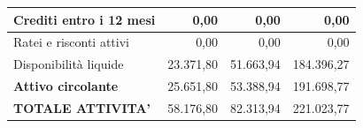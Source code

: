 \documentclass[12pt, a4paper]{article}
\begin{document}
\begin{center}
\begin{tabular}{|l|r|r|r|}
        Crediti entro i 12 mesi                                       & 0,00                                                          & 0,00                                                          & 0,00                                                          \\ \hline
        Ratei e risconti attivi                                       & 0,00                                                          & 0,00                                                          & 0,00                                                          \\ \hline
        Disponibilità liquide                                         & 23.371,80                                                     & 51.663,94                                                     & 184.396,27                                                    \\ \hline
        \rowcolor[HTML]{EFEFEF}
        \textbf{Attivo circolante}                                    & 25.651,80                                                     & 53.388,94                                                     & 191.698,77                                                    \\ \hline
        \rowcolor[HTML]{CBCEFB}
        \textbf{TOTALE ATTIVITA'}                                     & 58.176,80                                                     & 82.313,94                                                     & 221.023,77                                                    \\ \hline
    \end{tabular}
\end{center}\medskip
\end{document}
